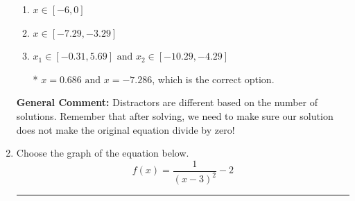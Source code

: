 \documentclass{extbook}[14pt]
\newcommand{\litem}[1]{\item #1

\rule{\textwidth}{0.4pt}}
\begin{document}
\begin{enumerate}
{\begin{enumerate}[label=\Alph*.]
\item \( x \in [-6,0] \)


\item \( x \in [-7.29,-3.29] \)


\item \( x_1 \in [-0.31, 5.69] \text{ and } x_2 \in [-10.29,-4.29] \)

* $x = 0.686 \text{ and } x = -7.286$, which is the correct option.
\end{enumerate}

\textbf{General Comment:} Distractors are different based on the number of solutions. Remember that after solving, we need to make sure our solution does not make the original equation divide by zero!
}
\litem{
Choose the graph of the equation below.
\[ f(x) = \frac{1}{(x - 3)^2} - 2 \]

}
\end{enumerate}
\end{document}

